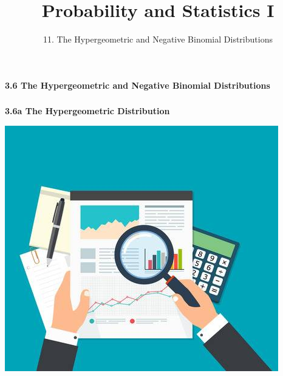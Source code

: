 

\newcommand{\lecturenum}{11}

\title[SS2857]{Probability and Statistics I}
\subtitle{\lecturenum. The Hypergeometric and Negative Binomial Distributions}

\date{}






{

\begin{frame}
  \addtocounter{framenumber}{-1}

  \maketitle
\end{frame}
}

\begin{frame}
  \frametitle{}

  \begin{center}
    \Large{\textbf{3.6 The Hypergeometric and Negative Binomial Distributions}}
  \end{center}


\end{frame}

\begin{frame}
  \frametitle{}

  \begin{center}
    \Large{\textbf{3.6a The Hypergeometric Distribution}}
  \end{center}

  \begin{center}
    \includegraphics[height=.5\textheight]{figure/audit}
  \end{center}

\end{frame}

